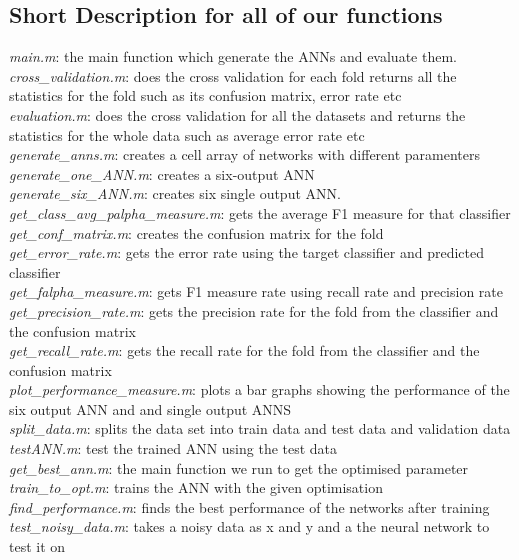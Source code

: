\documentclass[a4wide, 11pt]{article}
\begin{document}
\subsection{Short Description for all of our functions}
\textit{main.m}: the main function which generate the ANNs and evaluate them.\\
\textit{cross\_validation.m}: does the cross validation for each fold returns all the statistics for the fold such as its confusion matrix, error rate etc\\
\textit{evaluation.m}: does the cross validation for all the datasets and returns the statistics for the whole data such as average error rate etc\\
\textit{generate\_anns.m}: creates a cell array of networks with different paramenters\\
\textit{generate\_one\_ANN.m}: creates a six-output ANN\\
\textit{generate\_six\_ANN.m}: creates six single output ANN.\\
\textit{get\_class\_avg\_palpha\_measure.m}: gets the average F1 measure for that classifier\\
\textit{get\_conf\_matrix.m}: creates the confusion matrix for the fold\\
\textit{get\_error\_rate.m}:  gets the error rate using the target classifier and predicted classifier\\
\textit{get\_falpha\_measure.m}: gets F1 measure rate using recall rate and precision rate\\
\textit{get\_precision\_rate.m}: gets the precision rate for the fold from the classifier and the confusion matrix\\
\textit{get\_recall\_rate.m}: gets the recall rate for the fold from the classifier and the confusion matrix\\
\textit{plot\_performance\_measure.m}: plots a bar graphs showing the performance of the six output ANN and and single output ANNS\\
\textit{split\_data.m}: splits the data set into train data and test data and validation data\\
\textit{testANN.m}: test the trained ANN using the test data\\
\textit{get\_best\_ann.m}: the main function we run to get the optimised parameter\\
\textit{train\_to\_opt.m}: trains the ANN with the given optimisation\\
\textit{find\_performance.m}: finds the best performance of the networks after training\\
\textit{test\_noisy\_data.m}:     takes a noisy data as x and y and a the neural network to test it on\\
\end{document}
